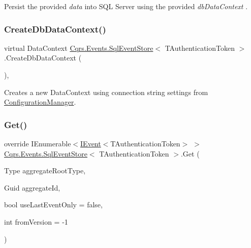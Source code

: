 Persist the provided {\itshape data}  into S\+QL Server using the provided {\itshape db\+Data\+Context} . 

\mbox{\label{classCqrs_1_1Events_1_1SqlEventStore_a47a3fb01f9ccc65ec52ad96236cea3fb_a47a3fb01f9ccc65ec52ad96236cea3fb}} 
\subsubsection{\texorpdfstring{Create\+Db\+Data\+Context()}{CreateDbDataContext()}}
{\footnotesize\ttfamily virtual Data\+Context \hyperlink{classCqrs_1_1Events_1_1SqlEventStore}{Cqrs.\+Events.\+Sql\+Event\+Store}$<$ T\+Authentication\+Token $>$.Create\+Db\+Data\+Context (\begin{DoxyParamCaption}{ }\end{DoxyParamCaption})\hspace{0.3cm}{\ttfamily [protected]}, {\ttfamily [virtual]}}



Creates a new Data\+Context using connection string settings from \hyperlink{classCqrs_1_1Events_1_1SqlEventStore_ac74de2a6905b38d167bcb23055e19b3d_ac74de2a6905b38d167bcb23055e19b3d}{Configuration\+Manager}. 

\mbox{\label{classCqrs_1_1Events_1_1SqlEventStore_a7e32a08a015642a5bc1cefa6998e6f11_a7e32a08a015642a5bc1cefa6998e6f11}} 
\subsubsection{\texorpdfstring{Get()}{Get()}\hspace{0.1cm}{\footnotesize\ttfamily [1/2]}}
{\footnotesize\ttfamily override I\+Enumerable$<$\hyperlink{interfaceCqrs_1_1Events_1_1IEvent}{I\+Event}$<$T\+Authentication\+Token$>$ $>$ \hyperlink{classCqrs_1_1Events_1_1SqlEventStore}{Cqrs.\+Events.\+Sql\+Event\+Store}$<$ T\+Authentication\+Token $>$.Get (\begin{DoxyParamCaption}\item[{Type}]{aggregate\+Root\+Type,  }\item[{Guid}]{aggregate\+Id,  }\item[{bool}]{use\+Last\+Event\+Only = {\ttfamily false},  }\item[{int}]{from\+Version = {\ttfamily -\/1} }\end{DoxyParamCaption})\hspace{0.3cm}{\ttfamily [virtual]}}



